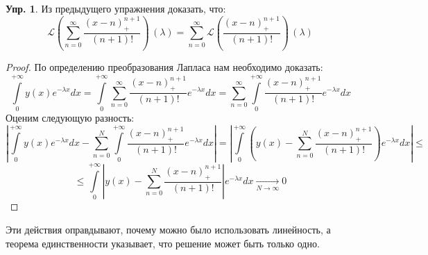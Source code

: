 \documentclass[12pt]{article}
\newcommand{\ML}{\mathcal{L}}
\theoremstyle{definition}
\newtheorem{exrc}{Упр.}
\newcommand{\ddsum}[2]{\displaystyle\sum\limits_{#1}^{#2}}
\newcommand{\ddint}[2]{\displaystyle\int\limits_{#1}^{#2}}
\begin{document}
\begin{exrc}
	Из предыдущего упражнения доказать, что:
	$$
		\ML\left(\sum\limits_{n = 0}^{\infty}\dfrac{(x - n)_{+}^{n+1}}{(n+1)!}\right)\, (\lambda) = \sum\limits_{n = 0}^{\infty}\ML\left(\dfrac{(x - n)_{+}^{n+1}}{(n+1)!}\right)\, (\lambda)
	$$
\end{exrc}
\begin{proof}
	По определению преобразования Лапласа нам необходимо доказать:
	$$
		\ddint{0}{+\infty}y(x)e^{-\lambda x}dx = \ddint{0}{+\infty}\ddsum{n = 0}{\infty}\dfrac{(x - n)_{+}^{n+1}}{(n+1)!}e^{-\lambda x}dx = \ddsum{n = 0}{\infty}\ddint{0}{+\infty}\dfrac{(x-n)_{+}^{n+1}}{(n+1)!}e^{-\lambda x}dx 
	$$
	Оценим следующую разность:
	$$
		\left|\ddint{0}{+\infty}y(x)e^{-\lambda x}dx - \ddsum{n = 0}{N}\ddint{0}{+\infty}\dfrac{(x - n)_{+}^{n+1}}{(n+1)!}e^{-\lambda x}dx \right|	= \left|  \ddint{0}{+\infty}\left(y(x) - \ddsum{n = 0}{N}\dfrac{(x-n)_{+}^{n+1}}{(n+1)!}\right)e^{-\lambda x}dx \right| \leq
	$$
	$$
		\leq \ddint{0}{+\infty}\left|y(x) - \ddsum{n = 0}{N}\dfrac{(x-n)_{+}^{n+1}}{(n+1)!}\right|e^{-\lambda x}dx \xrightarrow[N \to \infty]{} 0
	$$
\end{proof}
Эти действия оправдывают, почему можно было использовать линейность, а теорема единственности указывает, что решение может быть только одно.
\end{document}

